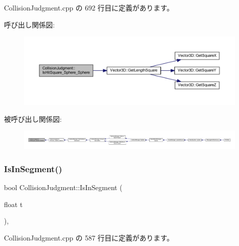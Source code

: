  Collision\+Judgment.\+cpp の 692 行目に定義があります。

呼び出し関係図\+:\nopagebreak
\begin{figure}[H]
\begin{center}
\leavevmode
\includegraphics[width=350pt]{class_collision_judgment_ae67e650c3a7b610a6bafaef3f17dadeb_cgraph}
\end{center}
\end{figure}
被呼び出し関係図\+:
\nopagebreak
\begin{figure}[H]
\begin{center}
\leavevmode
\includegraphics[width=350pt]{class_collision_judgment_ae67e650c3a7b610a6bafaef3f17dadeb_icgraph}
\end{center}
\end{figure}
\mbox{\label{class_collision_judgment_a5fd5784d3e7d0ce09f5bda5603a8ca36}} 
\subsubsection{\texorpdfstring{Is\+In\+Segment()}{IsInSegment()}}
{\footnotesize\ttfamily bool Collision\+Judgment\+::\+Is\+In\+Segment (\begin{DoxyParamCaption}\item[{float}]{t }\end{DoxyParamCaption})\hspace{0.3cm}{\ttfamily [static]}, {\ttfamily [private]}}



 Collision\+Judgment.\+cpp の 587 行目に定義があります。

